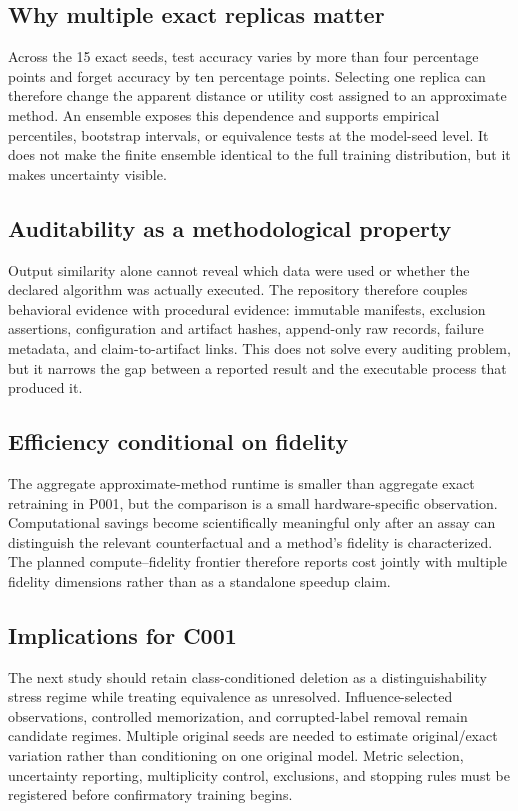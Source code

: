 \subsection{Why multiple exact replicas matter}
Across the 15 exact seeds, test accuracy varies by more than four percentage points and
forget accuracy by ten percentage points. Selecting one replica can therefore change the
apparent distance or utility cost assigned to an approximate method. An ensemble exposes
this dependence and supports empirical percentiles, bootstrap intervals, or equivalence
tests at the model-seed level. It does not make the finite ensemble identical to the full
training distribution, but it makes uncertainty visible.

\subsection{Auditability as a methodological property}
Output similarity alone cannot reveal which data were used or whether the declared
algorithm was actually executed. The repository therefore couples behavioral evidence
with procedural evidence: immutable manifests, exclusion assertions, configuration and
artifact hashes, append-only raw records, failure metadata, and claim-to-artifact links.
This does not solve every auditing problem, but it narrows the gap between a reported result
and the executable process that produced it.

\subsection{Efficiency conditional on fidelity}
The aggregate approximate-method runtime is smaller than aggregate exact retraining in
P001, but the comparison is a small hardware-specific observation. Computational savings
become scientifically meaningful only after an assay can distinguish the relevant
counterfactual and a method's fidelity is characterized. The planned compute--fidelity
frontier therefore reports cost jointly with multiple fidelity dimensions rather than as a
standalone speedup claim.

\subsection{Implications for C001}
The next study should retain class-conditioned deletion as a distinguishability stress
regime while treating equivalence as unresolved. Influence-selected observations,
controlled memorization, and corrupted-label removal remain candidate regimes. Multiple
original seeds are needed to estimate original/exact variation rather than conditioning on
one original model. Metric selection, uncertainty reporting, multiplicity control,
exclusions, and stopping rules must be registered before confirmatory training begins.

